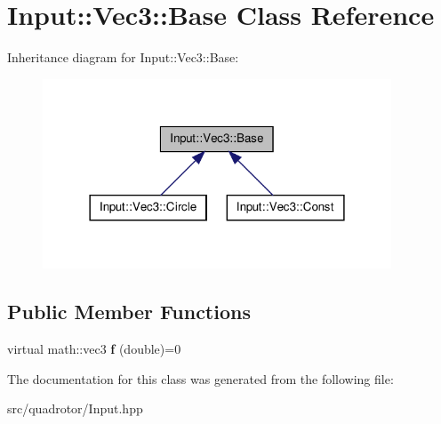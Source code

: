 \hypertarget{classInput_1_1Vec3_1_1Base}{\section{\-Input\-:\-:\-Vec3\-:\-:\-Base \-Class \-Reference}
\label{classInput_1_1Vec3_1_1Base}
}


\-Inheritance diagram for \-Input\-:\-:\-Vec3\-:\-:\-Base\-:\nopagebreak
\begin{figure}[H]
\begin{center}
\leavevmode
\includegraphics[width=294pt]{classInput_1_1Vec3_1_1Base__inherit__graph}
\end{center}
\end{figure}
\subsection*{\-Public \-Member \-Functions}
\begin{DoxyCompactItemize}
\item 
\hypertarget{classInput_1_1Vec3_1_1Base_a2cabb8020f12e27257a220e89136e2cd}{virtual math\-::vec3 {\bfseries f} (double)=0}\label{classInput_1_1Vec3_1_1Base_a2cabb8020f12e27257a220e89136e2cd}

\end{DoxyCompactItemize}


\-The documentation for this class was generated from the following file\-:\begin{DoxyCompactItemize}
\item 
src/quadrotor/\-Input.\-hpp\end{DoxyCompactItemize}
